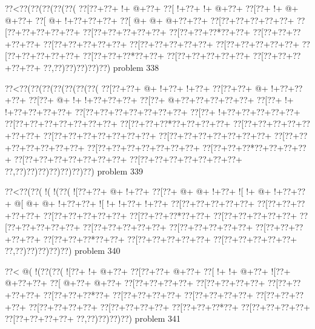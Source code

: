 \vbox{\vbox{\goo
\0??<\0??(\0??(\0??(\0??(\0??(
\0??[\0??+\0??+\- !+\- @+\0??+
\0??[\- !+\0??+\- !+\- @+\0??+
\0??[\0??+\- !+\- @+\- @+\0??+
\0??[\- @+\- !+\0??+\0??+\0??+
\0??[\- @+\- @+\- @+\0??+\0??+
\0??[\0??+\0??+\0??+\0??+\0??+
\0??[\0??+\0??+\0??+\0??+\0??+
\0??[\0??+\0??+\0??+\0??+\0??+
\0??[\0??+\0??+\0??*\0??+\0??+
\0??[\0??+\0??+\0??+\0??+\0??+
\0??[\0??+\0??+\0??+\0??+\0??+
\0??[\0??+\0??+\0??+\0??+\0??+
\0??[\0??+\0??+\0??+\0??+\0??+
\0??[\0??+\0??+\0??+\0??+\0??+
\0??[\0??+\0??+\0??*\0??+\0??+
\0??[\0??+\0??+\0??+\0??+\0??+
\0??[\0??+\0??+\0??+\0??+\0??+
\0??,\0??)\0??)\0??)\0??)\0??)
}
\hfil problem 338\hfil\break
}

\vbox{\vbox{\goo
\0??<\0??(\0??(\0??(\0??(\0??(\0??(\0??(
\0??[\0??+\0??+\- @+\- !+\0??+\- !+\0??+
\0??[\0??+\0??+\- @+\- !+\0??+\0??+\0??+
\0??[\0??+\- @+\- !+\- !+\0??+\0??+\0??+
\0??[\0??+\- @+\0??+\0??+\0??+\0??+\0??+
\0??[\0??+\- !+\- !+\0??+\0??+\0??+\0??+
\0??[\0??+\0??+\0??+\0??+\0??+\0??+\0??+
\0??[\0??+\- !+\0??+\0??+\0??+\0??+\0??+
\0??[\0??+\0??+\0??+\0??+\0??+\0??+\0??+
\0??[\0??+\0??+\0??*\0??+\0??+\0??+\0??+
\0??[\0??+\0??+\0??+\0??+\0??+\0??+\0??+
\0??[\0??+\0??+\0??+\0??+\0??+\0??+\0??+
\0??[\0??+\0??+\0??+\0??+\0??+\0??+\0??+
\0??[\0??+\0??+\0??+\0??+\0??+\0??+\0??+
\0??[\0??+\0??+\0??+\0??+\0??+\0??+\0??+
\0??[\0??+\0??+\0??*\0??+\0??+\0??+\0??+
\0??[\0??+\0??+\0??+\0??+\0??+\0??+\0??+
\0??[\0??+\0??+\0??+\0??+\0??+\0??+\0??+
\0??,\0??)\0??)\0??)\0??)\0??)\0??)\0??)
}
\hfil problem 339\hfil\break
}

\vbox{\vbox{\goo
\0??<\0??(\0??(\- !(\- !(\0??(
\- ![\0??+\0??+\- @+\- !+\0??+
\0??[\0??+\- @+\- @+\- !+\0??+
\- ![\- !+\- @+\- !+\0??+\0??+
\- @[\- @+\- @+\- !+\0??+\0??+
\- ![\- !+\- !+\0??+\- !+\0??+
\0??[\0??+\0??+\0??+\0??+\0??+
\0??[\0??+\0??+\0??+\0??+\0??+
\0??[\0??+\0??+\0??+\0??+\0??+
\0??[\0??+\0??+\0??*\0??+\0??+
\0??[\0??+\0??+\0??+\0??+\0??+
\0??[\0??+\0??+\0??+\0??+\0??+
\0??[\0??+\0??+\0??+\0??+\0??+
\0??[\0??+\0??+\0??+\0??+\0??+
\0??[\0??+\0??+\0??+\0??+\0??+
\0??[\0??+\0??+\0??*\0??+\0??+
\0??[\0??+\0??+\0??+\0??+\0??+
\0??[\0??+\0??+\0??+\0??+\0??+
\0??,\0??)\0??)\0??)\0??)\0??)
}
\hfil problem 340\hfil\break
}

\vbox{\vbox{\goo
\0??<\- @(\- !(\0??(\0??(
\- ![\0??+\- !+\- @+\0??+
\0??[\0??+\0??+\- @+\0??+
\0??[\- !+\- !+\- @+\0??+
\- ![\0??+\- @+\0??+\0??+
\0??[\- @+\0??+\- @+\0??+
\0??[\0??+\0??+\0??+\0??+
\0??[\0??+\0??+\0??+\0??+
\0??[\0??+\0??+\0??+\0??+
\0??[\0??+\0??+\0??*\0??+
\0??[\0??+\0??+\0??+\0??+
\0??[\0??+\0??+\0??+\0??+
\0??[\0??+\0??+\0??+\0??+
\0??[\0??+\0??+\0??+\0??+
\0??[\0??+\0??+\0??+\0??+
\0??[\0??+\0??+\0??*\0??+
\0??[\0??+\0??+\0??+\0??+
\0??[\0??+\0??+\0??+\0??+
\0??,\0??)\0??)\0??)\0??)
}
\hfil problem 341\hfil\break
}


